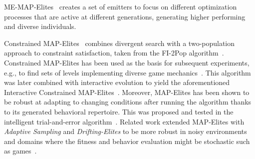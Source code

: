 ME-MAP-Elites~\cite{p9cully2020-multiemitter} creates a set of emitters to focus on different optimization processes that are active at different generations, generating higher performing and diverse individuals.%

Constrained MAP-Elites~\cite{p9Khalifa2018}
combines divergent search with a two-population approach to constraint satisfaction, taken from the FI-2Pop algorithm~\cite{p9Kimbrough2008}. Constrained MAP-Elites has been used as the basis for subsequent experiments, e.g., to find sets of levels implementing diverse game mechanics~\cite{p9charity2020mech}. This algorithm was later combined with interactive evolution to yield the aforementioned Interactive Constrained MAP-Elites~\cite{p9Alvarez2020-ICMAPE}. %
Moreover, MAP-Elites has been shown to be robust at adapting to changing conditions after running the algorithm thanks to its generated behavioral repertoire. This was proposed and tested in the intelligent trial-and-error algorithm~\cite{p9Cully2015-qdRobotsAnimals,Gonzalez-Duque2020-DifficultyTrialError}. 
Related work extended MAP-Elites with \emph{Adaptive Sampling} and \emph{Drifting-Elites} to be more robust in noisy environments and domains where the fitness and behavior evaluation might be stochastic such as games~\cite{p9Justesen2019-MAPElitesNoisyDomains}.





